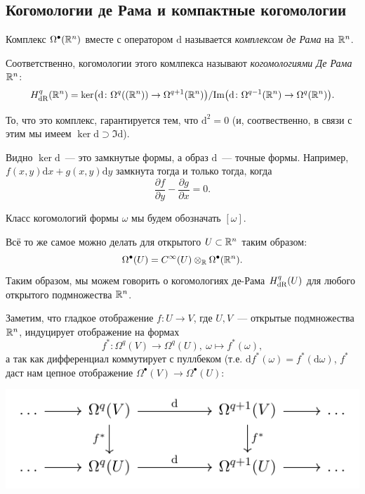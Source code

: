 \subsection{Когомологии де Рама и компактные когомологии}

	\begin{definition} 
		Комплекс $\Omega^{\bullet}(\mathbb{R}^n)$ вместе с оператором $\mathrm{d}$ называется \emph{комплексом де Рама} на $\mathbb{R}^n$.

		Соответственно, когомологии этого комлпекса называют \emph{когомологиями Де Рама} $\mathbb{R}^n$:
		\[
			H^{q}_{\mathrm{dR}}(\R^n) = \ker\lr*{\mathrm{d} \colon \Omega^{q}((\R^n)) \to \Omega^{q + 1}(\R^n)}/\mathrm{Im}\lr*{ \mathrm{d} \colon \Omega^{q - 1}(\R^n) \to \Omega^{q}(\R^n)}. 
		\]
	\end{definition}

	\begin{remark}
		То, что это комплекс, гарантируется тем, что $\mathrm{d}^2 = 0$ (и, соотвественно, в связи с этим мы имеем $\ker{\mathrm{d}} \supset \Im{\mathrm{d}}$).
	\end{remark}


	\begin{remark}
		Видно $\ker{\mathrm{d}}$~--- это замкнутые формы, а образ $\mathrm{d}$~--- точные формы. 	
		Например, $f(x, y) \mathrm{d}x + g(x, y) \mathrm{d}y$ замкнута тогда и только тогда, когда 
		\[
			\frac{\partial f}{\partial y} - \frac{\partial g}{\partial x} = 0.
		\]
	\end{remark}

	Класс когомологий формы $\omega$ мы будем обозначать $[\omega]$. 

	\begin{remark}
		Всё то же самое можно делать для открытого $U \subset \mathbb{R}^n$ таким образом: 
		\[
			\Omega^{\bullet}(U) = C^{\infty}(U) \otimes_{\mathbb{R}} \Omega^{\bullet}(\mathbb{R}^n).
		\]
		Таким образом, мы можем говорить о когомологиях де-Рама $H^{q}_{\operatorname{dR}}(U)$ для любого открытого подмножества $\mathbb{R}^n$. 
	\end{remark}

	Заметим, что гладкое отображение $f\colon U \to V$, где $U, V$~--- открытые  подмножества $\mathbb{R}^n$, индуцирует отображение на формах 
	\[
		f^{*}\colon \Omega^{q}(V) \to \Omega^{q}(U), \ \omega \mapsto f^{*}(\omega),
	\]
	а так как дифференциал коммутирует с пуллбеком (т.е. $\mathrm{d} f^{*}(\omega) = f^{*}(\mathrm{d}\omega)$, $f^{*}$ даст нам цепное отображение $\Omega^{\bullet}(V) \to \Omega^{\bullet}(U)$:


	\begin{center}
		\includegraphics{lectures/7/pictures/cd_2.pdf}
	\end{center}

